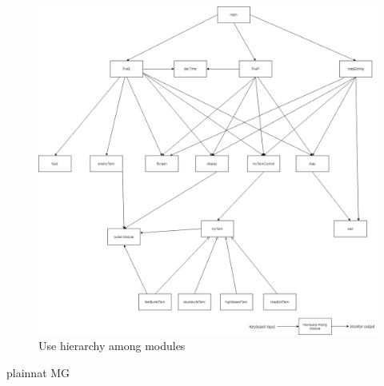 \documentclass[12pt, titlepage]{article}
\begin{document}
\begin{figure}[H]
\centering
\includegraphics[width=1.05\textwidth]{useHierarchy.png}
\caption{Use hierarchy among modules}
\label{FigUH}
\end{figure}


 {plainnat}
 {MG}
\end{document}
